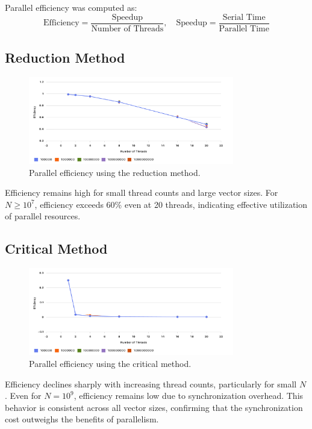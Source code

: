 \documentclass[unicode,11pt,a4paper,oneside,numbers=endperiod,openany]{scrartcl}
\begin{document}
Parallel efficiency was computed as:
\[
\text{Efficiency} = \frac{\text{Speedup}}{\text{Number of Threads}}, \quad \text{Speedup} = \frac{\text{Serial Time}}{\text{Parallel Time}}
\]

\subsection*{Reduction Method}

\begin{figure}[h]
    \centering
    \includegraphics[width=0.8\textwidth]{./figures/Figure 3: Parallel Efficiency - Reduction Method.png}
    \caption{Parallel efficiency using the reduction method.}
\end{figure}

Efficiency remains high for small thread counts and large vector sizes. For $N \geq 10^7$, efficiency exceeds 60\% even at 20 threads, indicating effective utilization of parallel resources.
\subsection*{Critical Method}

\begin{figure}[h]
    \centering
    \includegraphics[width=0.8\textwidth]{./figures/Figure 4: Parallel Efficiency - Critical Method.png}
    \caption{Parallel efficiency using the critical method.}
\end{figure}

Efficiency declines sharply with increasing thread counts, particularly for small $N$. Even for $N = 10^9$, efficiency remains low due to synchronization overhead. This behavior is consistent across all vector sizes, confirming that the synchronization cost outweighs the benefits of parallelism.
\end{document}
